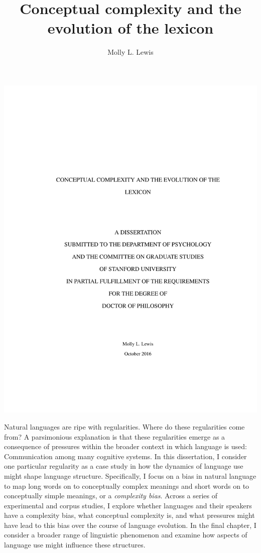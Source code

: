 \documentclass[12pt]{report}
\begin{document}
\title{Conceptual complexity and the evolution of the lexicon}
\author{Molly L. Lewis}
 
\beforepreface \includegraphics[]{disssertation.pdf}

Natural languages are ripe with regularities. Where do these regularities come from? A parsimonious explanation is that these regularities emerge as a consequence of pressures within the broader context in which language is used: Communication among many cognitive systems. In this dissertation, I consider one particular regularity as a case study in how the dynamics of language use might shape language structure. Specifically, I focus on a bias in natural language to map long words on to conceptually complex meanings and short words on to conceptually simple meanings, or a {\it complexity bias}. Across a series of experimental and corpus studies, I explore whether languages and their speakers have a complexity bias, what conceptual complexity is, and what pressures might have lead to this bias over the course of language evolution. In the final chapter, I consider a broader range of linguistic phenomenon and examine how aspects of language use might influence these structures. 
\end{document}
